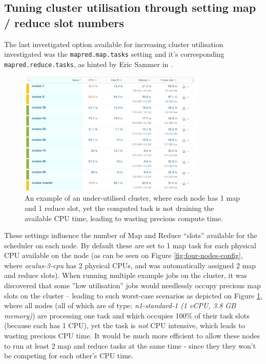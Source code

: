 \subsection{Tuning cluster utilisation through setting map / reduce slot numbers}
\label{sec:tuning-cluster-utilisation}
The last investigated option available for increasing cluster utilisation investigated was the \verb|mapred.map.tasks| setting and it's corresponding \verb|mapred.reduce.tasks|, as hinted by Eric Sammer in \cite{hadoop-ops}.

\begin{figure}[ch!]
  \centering
  \includegraphics[width=0.8\textwidth]{img/hadoop/10nodes-newrelic-suffering-from-no-data-locallity}
  \caption{An example of an under-utilised cluster, where each node has 1 map and 1 reduce slot, yet the computed task is not draining the available CPU time, leading to wasting precious compute time.}
  \label{fig:ten-under-utilised-cluster}
\end{figure}

These settings influence the number of Map and Reduce ``slots'' available for the scheduler on each node. By default these are set to 1 map task for each physical CPU available on the node (as can be seen on Figure \ref{fig:four-nodes-config}, where \textit{oculus-3-cpu} has 2 physical CPUs, and was automatically assigned 2 map and reduce slots). When running multiple example jobs on the cluster, it was discovered that some ''low utilisation'' jobs would needlessly occupy precious map slots on the cluster -- leading to such worst-case scenarios as depicted on Figure \ref{fig:ten-under-utilised-cluster}, where all nodes (all of which are of type: \textit{n1-standard-1 (1 vCPU, 3.8 GB memory)}) are processing one task and which occupies 100\% of their task slots (because each has 1 CPU), yet the task is \textit{not} CPU intensive, which leads to wasting precious CPU time. It would be much more efficient to allow these nodes to run at least 2 map and reduce tasks at the same time - since they they won't be competing for each other's CPU time.

